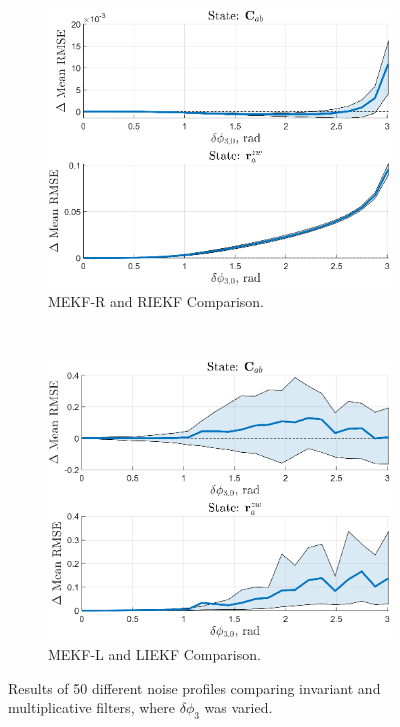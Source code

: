 \begin{figure}
	\centering
	\begin{subfigure}[b]{0.5\textwidth}
		\includegraphics[width=\textwidth]{figs/se3/noise_trials/comp_att_diff_state_Att_R.eps}
		\caption{MEKF-R and RIEKF Comparison.}
	\end{subfigure}
	~
	\begin{subfigure}[b]{0.5\textwidth}
		\includegraphics[width=\textwidth]{figs/se3/noise_trials/comp_att_diff_state_Att_L.eps}
		\caption{MEKF-L and LIEKF Comparison.}
	\end{subfigure}
	\caption[Results of different noise profiles where $\delta \phi_3$ was varied.]{Results of 50 different noise profiles comparing invariant and multiplicative filters, where $\delta \phi_3$ was varied. }
	\label{fig:comp_att}
\end{figure}

